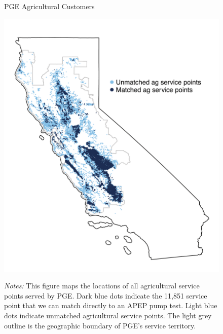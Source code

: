 
\begin{figure}[h!]\centering
\captionsetup{width=\textwidth}
\caption{PGE Agricultural Customers}
\label{fig:pge_ca_map}
\vspace{-2mm}
{\includegraphics[width=.8\textwidth, trim={2mm 20mm 2mm 45mm}, clip]{figures/pge_ca_map.png}}\\
\captionsetup{width=.85\textwidth}
\caption*{\footnotesize \emph{Notes:} This figure maps the locations of all agricultural service points served by PGE. Dark blue dots indicate the 11,851 service point that we can match directly to an APEP pump test. Light blue dots indicate unmatched agricultural service points. The light grey outline is the geographic boundary of PGE's service territory. }
\end{figure}